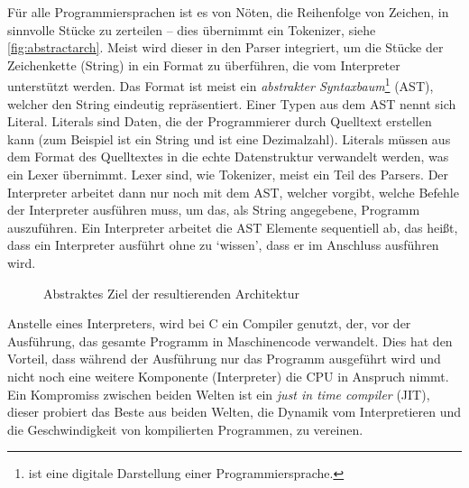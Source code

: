       Für alle Programmiersprachen ist es von Nöten, die Reihenfolge von Zeichen, in sinnvolle Stücke zu zerteilen -- dies übernimmt ein Tokenizer, siehe \autoref{fig:abstractarch}. Meist wird dieser in den Parser \autocite[S.46]{eirund2013formale} integriert, um die Stücke der Zeichenkette (String) in ein Format zu überführen, die vom Interpreter unterstützt werden. Das Format ist meist ein \emph{abstrakter Syntaxbaum}\footnote{
         ist eine digitale Darstellung einer Programmiersprache.
      } (AST), welcher den String eindeutig repräsentiert. Einer Typen aus dem AST nennt sich Literal. Literals sind Daten, die der Programmierer durch Quelltext erstellen kann (zum Beispiel ist  ein String und  ist eine Dezimalzahl). Literals müssen aus dem Format des Quelltextes in die echte Datenstruktur verwandelt werden, was ein Lexer übernimmt. Lexer sind, wie Tokenizer, meist ein Teil des Parsers. Der Interpreter arbeitet dann nur noch mit dem AST, welcher vorgibt, welche Befehle der Interpreter ausführen muss, um das, als String angegebene, Programm auszuführen. Ein Interpreter arbeitet die AST Elemente sequentiell ab, das heißt, dass ein Interpreter  ausführt ohne zu `wissen', dass er im Anschluss  ausführen wird.
      \begin{figure}[H]
        \centering
        \caption{Abstraktes Ziel der resultierenden Architektur}
        \label{fig:abstractarch}
      \end{figure}
      Anstelle eines Interpreters, wird bei C ein Compiler genutzt, der, vor der Ausführung, das gesamte Programm in Maschinencode verwandelt. Dies hat den Vorteil, dass während der Ausführung nur das Programm ausgeführt wird und nicht noch eine weitere Komponente (Interpreter) die CPU in Anspruch nimmt. Ein Kompromiss zwischen beiden Welten ist ein \emph{just in time compiler} (JIT), dieser probiert das Beste aus beiden Welten, die Dynamik vom Interpretieren und die Geschwindigkeit von kompilierten Programmen, zu vereinen.

